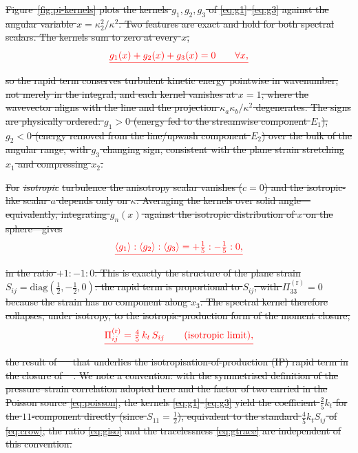 \documentclass[lineno]{JFM-FLM_Au}
\providecommand{\DIFdel}[1]{{\protect\color{red}\sout{#1}}}                      %
\begin{document}
\DIFdel{Figure~\ref{fig:pi-kernels} plots the kernels $g_1,g_2,g_3$ of
\eqref{eq:g1}--\eqref{eq:g3} against the angular variable
$x=\kappa_2^2/\kappa^2$. Two features are exact and hold for both spectral
scalars. The kernels sum to zero at every $x$,
}\begin{displaymath}
  \DIFdel{g_1(x)+g_2(x)+g_3(x)=0 \qquad \forall x,
}\end{displaymath}%
\DIFdel{so the rapid term conserves turbulent kinetic energy pointwise in wavenumber,
not merely in the integral; and each kernel vanishes at $x=1$, where the
wavevector aligns with the line and the projection $\kappa_a\kappa_b/\kappa^2$
degenerates. The signs are physically ordered: $g_1>0$ (energy fed to the
streamwise component $E_1$), $g_2<0$ (energy removed from the line/upwash
component $E_2$) over the bulk of the angular range, with $g_3$ changing sign,
consistent with the plane strain stretching $x_1$ and compressing $x_2$.
}%

\DIFdel{For }\emph{\DIFdel{isotropic}} %
\DIFdel{turbulence the anisotropy scalar vanishes ($c=0$) and the
isotropic-like scalar $a$ depends only on $\kappa$. Averaging the kernels over
solid angle---equivalently, integrating $g_n(x)$ against the isotropic
distribution of $x$ on the sphere---gives
}\begin{displaymath}
  \DIFdel{\langle g_1\rangle : \langle g_2\rangle : \langle g_3\rangle
  = +\tfrac15 : -\tfrac15 : 0,
}\end{displaymath}%
\DIFdel{in the ratio $+1:-1:0$. This is exactly the structure of the plane strain
$S_{ij}=\mathrm{diag}(\tfrac12,-\tfrac12,0)$: the rapid term is proportional to
$S_{ij}$, with $\Pi^{(\mathrm r)}_{33}=0$ because the strain has no component
along $x_3$. The spectral kernel therefore collapses, under isotropy, to the
isotropic-production form of the moment closure,
}\begin{displaymath}
  \DIFdel{\Pi^{(\mathrm r)}_{ij}
  = \tfrac{4}{5}\,k_t\,S_{ij}
  \qquad(\text{isotropic limit}),
}\end{displaymath}%
\DIFdel{the result of \mbox{%
\citet{Crow1968} }\hskip0pt%
that underlies the isotropisation-of-production
(IP) rapid term in the closure of \mbox{%
\citet{LaunderReeceRodi1975}}\hskip0pt%
. We note a
convention: with the symmetrised definition of the pressure--strain correlation
adopted here and the factor of two carried in the Poisson source
\eqref{eq:poisson}, the kernels \eqref{eq:g1}--\eqref{eq:g3} yield the
coefficient $\tfrac25 k_t$ for the $11$-component directly (since $S_{11}=\tfrac12$),
equivalent to the standard $\tfrac45 k_t S_{ij}$ of \eqref{eq:crow}; the ratio
\eqref{eq:giso} and the tracelessness \eqref{eq:gtrace} are independent of this
convention.
}%
\end{document}
